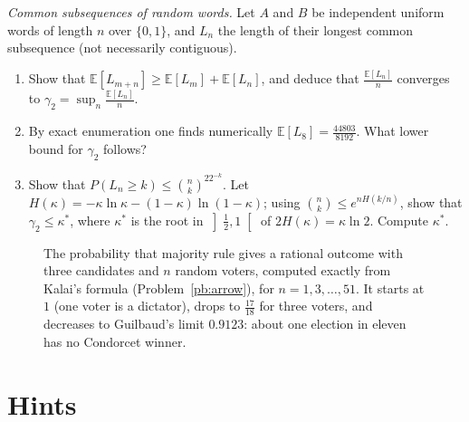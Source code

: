 \begin{exercise}[$\star\star\star$]\label{pb:lcs}
\emph{Common subsequences of random words.} Let $A$ and $B$ be independent uniform words of length $n$ over $\{0,1\}$, and $L_n$ the length of their longest common
subsequence (not necessarily contiguous).
\begin{enumerate}[label=(\alph*)]
\item Show that $\mathbb E[L_{m+n}]\ge\mathbb E[L_m]+\mathbb E[L_n]$, and deduce that $\frac{\mathbb E[L_n]}n$ converges to $\gamma_2=\sup_n\frac{\mathbb E[L_n]}n$.
\item By exact enumeration one finds numerically $\mathbb E[L_8]=\frac{44803}{8192}$. What lower bound for $\gamma_2$ follows?
\item Show that $P(L_n\ge k)\le\binom nk^22^{-k}$. Let $H(\kappa)=-\kappa\ln\kappa-(1-\kappa)\ln(1-\kappa)$; using $\binom nk\le e^{nH(k/n)}$, show that $\gamma_2\le\kappa^*$, where $\kappa^*$ is the root in
$\left]\frac12,1\right[$ of $2H(\kappa)=\kappa\ln2$. Compute $\kappa^*$.
\end{enumerate}
\end{exercise}

\begin{figure}[ht]
\centering
{}
\caption{The probability that majority rule gives a rational outcome with three candidates and $n$ random voters, computed
exactly from Kalai's formula (Problem~\ref{pb:arrow}), for $n=1,3,\dots,51$. It starts at $1$ (one voter is a dictator), drops to
$\frac{17}{18}$ for three voters, and decreases to Guilbaud's limit $0.9123$: about one election in eleven has no Condorcet winner.}
\label{fig:condorcet}
\end{figure}

\section{Hints}

